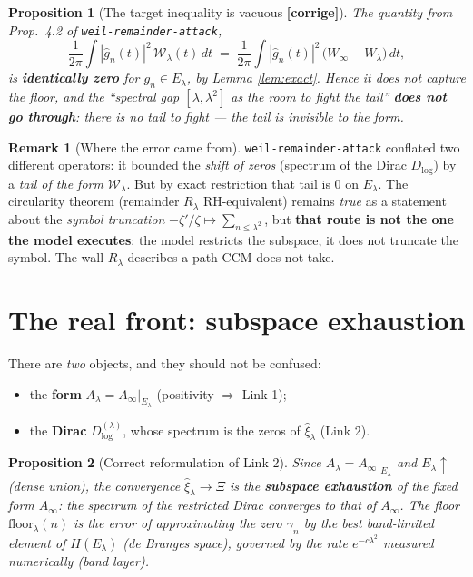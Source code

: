 \documentclass[11pt]{article}
\newcommand{\RETRACT}{\textcolor{orange!85!black}{\textbf{[corrige]}}}
\theoremstyle{plain}
\newtheorem{proposition}{Proposition}
\theoremstyle{definition}
\newtheorem{remark}{Remark}
\newcommand{\xih}{\widehat{\xi}}
\newcommand{\El}{E_\lambda}
\begin{document}
\begin{proposition}[The target inequality is vacuous \RETRACT]\label{prop:vacuo}
The quantity from Prop.\ 4.2 of \texttt{weil-remainder-attack},
\[
  \frac1{2\pi}\int|\widehat g_n(t)|^2\,\mathcal W_\lambda(t)\,dt
  \;=\;\frac1{2\pi}\int|\widehat g_n(t)|^2\,\bigl(W_\infty-W_\lambda\bigr)\,dt,
\]
is \textbf{identically zero} for $g_n\in\El$, by Lemma \ref{lem:exact}. Hence it
does not capture the floor, and the ``spectral gap $[\lambda,\lambda^2]$ as the
room to fight the tail'' \textbf{does not go through}: there is no tail to fight ---
the tail is invisible to the form.
\end{proposition}

\begin{remark}[Where the error came from]
\texttt{weil-remainder-attack} conflated two different operators: it bounded the
\emph{shift of zeros} (spectrum of the Dirac $D_{\log}$) by a \emph{tail of the
form} $\mathcal W_\lambda$. But by exact restriction that tail is $0$ on $\El$. The
circularity theorem (remainder $R_\lambda$ RH-equivalent) remains \emph{true} as a
statement about the \emph{symbol truncation}
$-\zeta'/\zeta\mapsto\sum_{n\le\lambda^2}$, but \textbf{that route is not the one
the model executes}: the model restricts the subspace, it does not truncate the
symbol. The wall $R_\lambda$ describes a path CCM does not take.
\end{remark}

\section{The real front: subspace exhaustion}\label{sec:real}

There are \emph{two} objects, and they should not be confused:
\begin{itemize}[leftmargin=1.5em]
\item the \textbf{form} $A_\lambda=A_\infty|_{\El}$ (positivity $\Rightarrow$
Link 1);
\item the \textbf{Dirac} $D_{\log}^{(\lambda)}$, whose spectrum is the zeros of
$\xih_\lambda$ (Link 2).
\end{itemize}

\begin{proposition}[Correct reformulation of Link 2]\label{prop:real}
Since $A_\lambda=A_\infty|_{\El}$ and $\El\uparrow$ (dense union), the convergence
$\xih_\lambda\to\Xi$ is the \textbf{subspace exhaustion} of the fixed form
$A_\infty$: the spectrum of the restricted Dirac converges to that of $A_\infty$.
The floor $\mathrm{floor}_\lambda(n)$ is the error of approximating the zero
$\gamma_n$ by the best band-limited element of $H(\El)$ (de Branges space),
governed by the rate $e^{-c\lambda^2}$ measured numerically (band layer).
\end{proposition}
\end{document}
